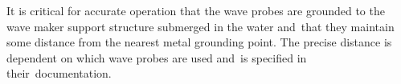 \documentclass[hardware,article,submit,pdftex,moreauthors]{Definitions/mdpi}
\begin{document}
It is critical for accurate operation that the wave probes are grounded to the wave maker support structure submerged in the water and~that they maintain some distance from the nearest metal grounding point.
The precise distance is dependent on which wave probes are used and~is specified in their~documentation.


%
%
\end{document}
